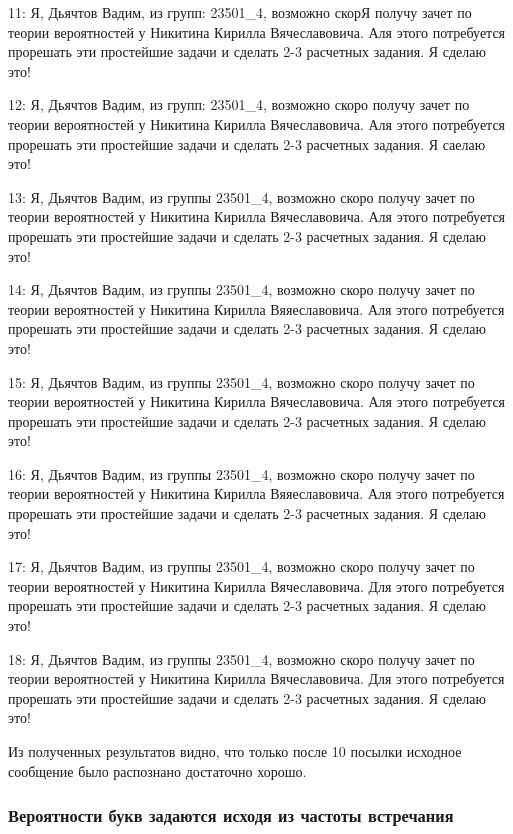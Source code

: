 {11: Я, Дьячтов Вадим, из групп: 23501\_4, возможно скорЯ получу зачет по теории вероятностей у Никитина Кирилла Вячеславовича. Аля этого потребуется прорешать эти простейшие задачи и сделать 2-3 расчетных задания. Я сделаю это!

12: Я, Дьячтов Вадим, из групп: 23501\_4, возможно скоро получу зачет по теории вероятностей у Никитина Кирилла Вячеславовича. Аля этого потребуется прорешать эти простейшие задачи и сделать 2-3 расчетных задания. Я саелаю это!

13: Я, Дьячтов Вадим, из группы 23501\_4, возможно скоро получу зачет по теории вероятностей у Никитина Кирилла Вячеславовича. Аля этого потребуется прорешать эти простейшие задачи и сделать 2-3 расчетных задания. Я сделаю это!

14: Я, Дьячтов Вадим, из группы 23501\_4, возможно скоро получу зачет по теории вероятностей у Никитина Кирилла Вяяеславовича. Аля этого потребуется прорешать эти простейшие задачи и сделать 2-3 расчетных задания. Я сделаю это!

15: Я, Дьячтов Вадим, из группы 23501\_4, возможно скоро получу зачет по теории вероятностей у Никитина Кирилла Вячеславовича. Аля этого потребуется прорешать эти простейшие задачи и сделать 2-3 расчетных задания. Я сделаю это!

16: Я, Дьячтов Вадим, из группы 23501\_4, возможно скоро получу зачет по теории вероятностей у Никитина Кирилла Вяяеславовича. Аля этого потребуется прорешать эти простейшие задачи и сделать 2-3 расчетных задания. Я сделаю это!

17: Я, Дьячтов Вадим, из группы 23501\_4, возможно скоро получу зачет по теории вероятностей у Никитина Кирилла Вячеславовича. Для этого потребуется прорешать эти простейшие задачи и сделать 2-3 расчетных задания. Я сделаю это!

18: Я, Дьячтов Вадим, из группы 23501\_4, возможно скоро получу зачет по теории вероятностей у Никитина Кирилла Вячеславовича. Для этого потребуется прорешать эти простейшие задачи и сделать 2-3 расчетных задания. Я сделаю это!

}
\vspace{0.5cm}

Из полученных результатов видно, что только после 10 посылки исходное сообщение было распознано достаточно хорошо.

\subsubsection{Вероятности букв задаются исходя из частоты встречания}\label{sec:weghted}

